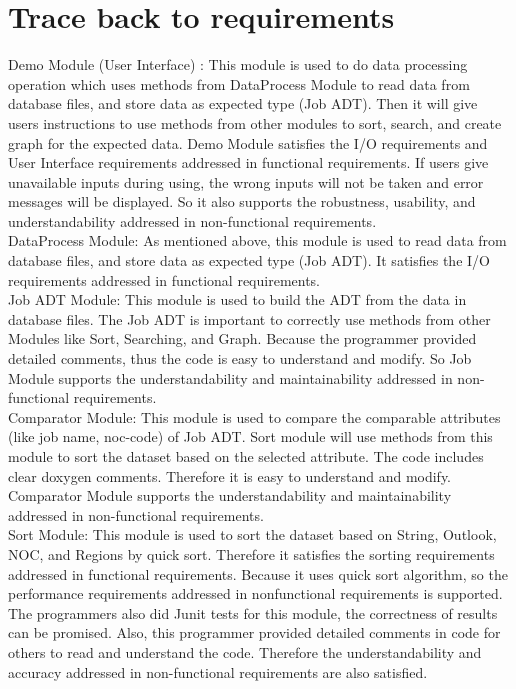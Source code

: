 \documentclass[12pt]{article}
\begin{document}
\section{Trace back to requirements}

Demo Module (User Interface) :  This module is used to do data processing operation which uses methods from DataProcess Module to read data from database files, and store data as expected type (Job ADT). Then it will give users instructions to use methods from other modules to sort, search, and create graph for the expected data. Demo Module satisfies the I/O requirements and User Interface requirements addressed in functional requirements. If users give unavailable inputs during using, the wrong inputs will not be taken and error messages will be displayed. So it also supports the robustness, usability, and understandability addressed in non-functional requirements.\\\newline 
DataProcess Module: As mentioned above, this module is used to read data from database files, and store data as expected type (Job ADT). It satisfies the I/O requirements addressed in functional requirements. \\\newline
Job ADT Module: This module is used to build the ADT from the data in database files. The Job ADT is important to correctly use methods from other Modules like Sort, Searching, and Graph. 
Because the programmer provided detailed comments, thus the code is easy to understand and modify. So Job Module supports the understandability and maintainability addressed in non-functional requirements.\\\newline
Comparator Module: This module is used to compare the comparable attributes (like job name, noc-code) of Job ADT. Sort module will use methods from this module to sort the dataset based on the selected attribute. The code includes clear doxygen comments. Therefore it is easy to understand and modify. Comparator Module supports the understandability and maintainability addressed in non-functional requirements.\\\newline
Sort Module: This module is used to sort the dataset based on String, Outlook, NOC, and Regions by quick sort. Therefore it satisfies the sorting requirements addressed in functional requirements. Because it uses quick sort algorithm, so the performance requirements addressed in nonfunctional requirements is supported. The programmers also did Junit tests for this module, the correctness of results can be promised. Also, this programmer provided detailed comments in code for others to read and understand the code. Therefore the understandability and accuracy addressed in non-functional requirements are also satisfied.\\\newline
\end{document}
